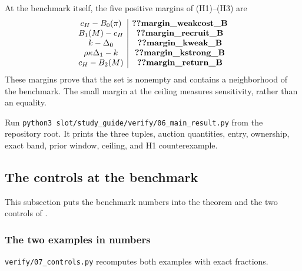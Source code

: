 At the benchmark itself, the five positive margins of (H1)--(H3) are
\[
\begin{array}{c|c}
c_H-B_0(\pi)&\reg{margin_weakcost_B}\\
B_1(M)-c_H&\reg{margin_recruit_B}\\
k-\Delta_0&\reg{margin_kweak_B}\\
\rho\kappa\Delta_1-k&\reg{margin_kstrong_B}\\
c_H-B_2(M)&\reg{margin_return_B}
\end{array}
\]
These margins prove that the set is nonempty and contains a neighborhood of the benchmark.
The small margin at the ceiling measures sensitivity, rather than an equality.

Run \texttt{python3 slot/study\_guide/verify/06\_main\_result.py} from the repository root.
It prints the three tuples, auction quantities, entry, ownership, exact band, prior window, ceiling, and H1 counterexample.

\subsection{The controls at the benchmark}\label{sec:benchmark-controls}

This subsection puts the benchmark numbers into the theorem and the two controls of .

\subsubsection{The two examples in numbers}

\texttt{verify/07\_controls.py} recomputes both examples with exact fractions.

